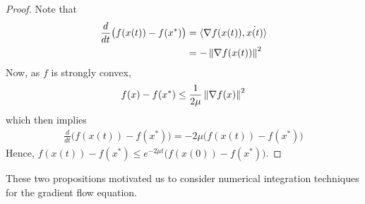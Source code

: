 \begin{proof}
Note that
\begin{align*}
\frac{d}{dt} \big( f(x(t)) - f(x^{*}) \big) &= \langle \nabla f(x(t)), \dot{x(t)} \rangle \\
&= - \left\lVert\nabla f(x(t))\right\rVert^{2}
\end{align*}
Now, as $f$ is strongly convex,
\begin{align*}
f(x) - f(x^{*}) \leq \frac{1}{2 \mu} \left\lVert\nabla f(x)\right\rVert^{2}
\end{align*}
which then implies
\begin{align*}
\frac{d}{dt} \big( f(x(t)) - f(x^{*}) \big) = -2 \mu \big( f(x(t)) - f(x^{*}) \big)
\end{align*}
Hence, $f(x(t)) - f(x^{*}) \leq e^{-2 \mu t} \big( f(x(0)) - f(x^{*}) \big)$.
\end{proof}

These two propositions motivated us to consider
numerical integration techniques for the gradient flow equation.

